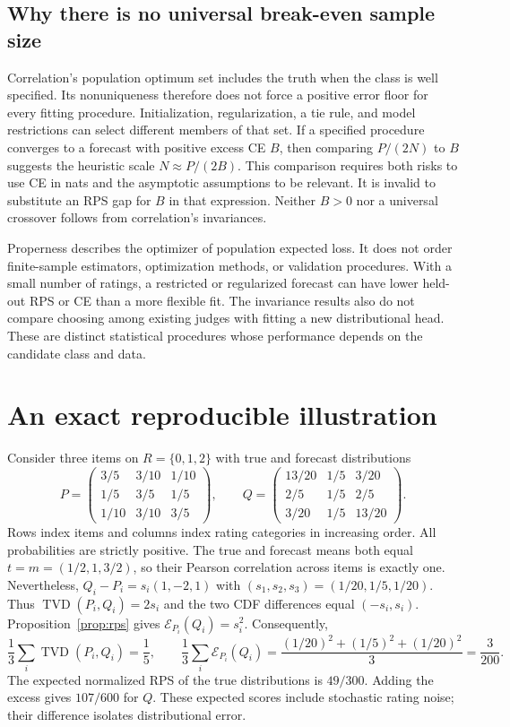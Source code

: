 \documentclass[11pt,letterpaper]{article}
\newcommand{\TV}{\operatorname{TVD}}
\begin{document}
\subsection{Why there is no universal break-even sample size}
Correlation's population optimum set includes the truth when the class is well specified.
Its nonuniqueness therefore does not force a positive error floor for every fitting procedure.
Initialization, regularization, a tie rule, and model restrictions can select different members of that set.
If a specified procedure converges to a forecast with positive excess CE $B$, then comparing $P/(2N)$ to $B$ suggests the heuristic scale $N\approx P/(2B)$.
This comparison requires both risks to use CE in nats and the asymptotic assumptions to be relevant.
It is invalid to substitute an RPS gap for $B$ in that expression.
Neither $B>0$ nor a universal crossover follows from correlation's invariances.

Properness describes the optimizer of population expected loss.
It does not order finite-sample estimators, optimization methods, or validation procedures.
With a small number of ratings, a restricted or regularized forecast can have lower held-out RPS or CE than a more flexible fit.
The invariance results also do not compare choosing among existing judges with fitting a new distributional head.
These are distinct statistical procedures whose performance depends on the candidate class and data.

\section{An exact reproducible illustration}\label{sec:example}
Consider three items on $R=\{0,1,2\}$ with true and forecast distributions
\begin{equation}\label{eq:example}
 P=\begin{pmatrix}
 3/5&3/10&1/10\\
 1/5&3/5&1/5\\
 1/10&3/10&3/5
 \end{pmatrix},\qquad
 Q=\begin{pmatrix}
 13/20&1/5&3/20\\
 2/5&1/5&2/5\\
 3/20&1/5&13/20
 \end{pmatrix}.
\end{equation}
Rows index items and columns index rating categories in increasing order.
All probabilities are strictly positive.
The true and forecast means both equal $t=m=(1/2,1,3/2)$, so their Pearson correlation across items is exactly one.
Nevertheless, $Q_i-P_i=s_i(1,-2,1)$ with $(s_1,s_2,s_3)=(1/20,1/5,1/20)$.
Thus $\TV(P_i,Q_i)=2s_i$ and the two CDF differences equal $(-s_i,s_i)$.
Proposition~\ref{prop:rps} gives $\mathcal E_{P_i}(Q_i)=s_i^2$.
Consequently,
\[
 \frac13\sum_i\TV(P_i,Q_i)=\frac15,\qquad
 \frac13\sum_i\mathcal E_{P_i}(Q_i)=\frac{(1/20)^2+(1/5)^2+(1/20)^2}{3}=\frac3{200}.
\]
The expected normalized RPS of the true distributions is $49/300$.
Adding the excess gives $107/600$ for $Q$.
These expected scores include stochastic rating noise; their difference isolates distributional error.
\end{document}
